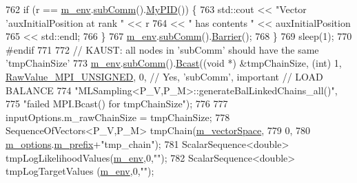 \begin{DoxyCode}
762       \textcolor{keywordflow}{if} (r == \hyperlink{class_q_u_e_s_o_1_1_m_l_sampling_a13f1ca4fe9f94822fe572a743eaced1d}{m\_env}.\hyperlink{class_q_u_e_s_o_1_1_base_environment_affe39f53e3d5d678842413370af09145}{subComm}().\hyperlink{class_q_u_e_s_o_1_1_mpi_comm_ab806f80f206210723fcb4df8185a55a8}{MyPID}()) \{
763   std::cout << \textcolor{stringliteral}{"Vector 'auxInitialPosition at rank "} << r
764                   << \textcolor{stringliteral}{" has contents "}                      << auxInitialPosition
765                   << std::endl;
766       \}
767       \hyperlink{class_q_u_e_s_o_1_1_m_l_sampling_a13f1ca4fe9f94822fe572a743eaced1d}{m\_env}.\hyperlink{class_q_u_e_s_o_1_1_base_environment_affe39f53e3d5d678842413370af09145}{subComm}().\hyperlink{class_q_u_e_s_o_1_1_mpi_comm_a4059971c30e023b272fccaa6aa00c426}{Barrier}();
768     \}
769     sleep(1);
770 \textcolor{preprocessor}{#endif}
771 \textcolor{preprocessor}{}
772     \textcolor{comment}{// KAUST: all nodes in 'subComm' should have the same 'tmpChainSize'}
773     \hyperlink{class_q_u_e_s_o_1_1_m_l_sampling_a13f1ca4fe9f94822fe572a743eaced1d}{m\_env}.\hyperlink{class_q_u_e_s_o_1_1_base_environment_affe39f53e3d5d678842413370af09145}{subComm}().\hyperlink{class_q_u_e_s_o_1_1_mpi_comm_abd6af8db8b0c7fd2f5b62e26477a9537}{Bcast}((\textcolor{keywordtype}{void} *) &tmpChainSize, (\textcolor{keywordtype}{int}) 1, 
      \hyperlink{_mpi_comm_8h_a06cbfbc33436f6e0dc8a48ff3c49bdfc}{RawValue\_MPI\_UNSIGNED}, 0, \textcolor{comment}{// Yes, 'subComm', important // LOAD BALANCE}
774                           \textcolor{stringliteral}{"MLSampling<P\_V,P\_M>::generateBalLinkedChains\_all()"},
775                           \textcolor{stringliteral}{"failed MPI.Bcast() for tmpChainSize"});
776 
777     inputOptions.m\_rawChainSize = tmpChainSize;
778     SequenceOfVectors<P\_V,P\_M> tmpChain(\hyperlink{class_q_u_e_s_o_1_1_m_l_sampling_a7bc4c72f65ba9166ed94a6e198b0915b}{m\_vectorSpace},
779                                                0,
780                                                \hyperlink{class_q_u_e_s_o_1_1_m_l_sampling_af8504cc57ec72b3c52833826b2bfff8e}{m\_options}.\hyperlink{class_q_u_e_s_o_1_1_m_l_sampling_options_a1d3d48598e0b59b46337ce66a52671a5}{m\_prefix}+\textcolor{stringliteral}{"tmp\_chain"});
781     ScalarSequence<double> tmpLogLikelihoodValues(\hyperlink{class_q_u_e_s_o_1_1_m_l_sampling_a13f1ca4fe9f94822fe572a743eaced1d}{m\_env},0,\textcolor{stringliteral}{""});
782     ScalarSequence<double> tmpLogTargetValues    (\hyperlink{class_q_u_e_s_o_1_1_m_l_sampling_a13f1ca4fe9f94822fe572a743eaced1d}{m\_env},0,\textcolor{stringliteral}{""});

\end{DoxyCode}
